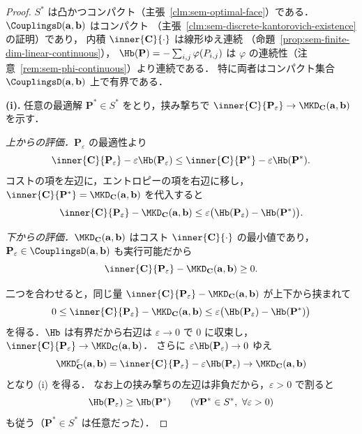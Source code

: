 \begin{proof}
  $S^*$ は凸かつコンパクト（主張~\ref{clm:sem-optimal-face}）である．
  $\CouplingsD(\mathbf{a},\mathbf{b})$ はコンパクト
  （主張~\ref{clm:sem-discrete-kantorovich-existence} の証明）であり，
  内積 $\inner{\mathbf{C}}{\cdot}$ は線形ゆえ連続
  （命題~\ref{prop:sem-finite-dim-linear-continuous}），
  $\Hb(\mathbf{P}) = -\sum_{i,j}\varphi(P_{i,j})$ は
  $\varphi$ の連続性（注意~\ref{rem:sem-phi-continuous}）より連続である．
  特に両者はコンパクト集合 $\CouplingsD(\mathbf{a},\mathbf{b})$ 上で有界である．

  \textbf{(i).}
  任意の最適解 $\mathbf{P}^* \in S^*$ をとり，挟み撃ちで
  $\inner{\mathbf{C}}{\mathbf{P}_\varepsilon} \to \MKD_{\mathbf{C}}(\mathbf{a},\mathbf{b})$ を示す．

  \emph{上からの評価．}$\mathbf{P}_\varepsilon$ の最適性より
  \[
    \inner{\mathbf{C}}{\mathbf{P}_\varepsilon} - \varepsilon\Hb(\mathbf{P}_\varepsilon)
    \leq
    \inner{\mathbf{C}}{\mathbf{P}^*} - \varepsilon\Hb(\mathbf{P}^*).
  \]
  コストの項を左辺に，エントロピーの項を右辺に移し，
  $\inner{\mathbf{C}}{\mathbf{P}^*} = \MKD_{\mathbf{C}}(\mathbf{a},\mathbf{b})$ を代入すると
  \[
    \inner{\mathbf{C}}{\mathbf{P}_\varepsilon} - \MKD_{\mathbf{C}}(\mathbf{a},\mathbf{b})
    \leq
    \varepsilon\bigl(\Hb(\mathbf{P}_\varepsilon) - \Hb(\mathbf{P}^*)\bigr).
  \]

  \emph{下からの評価．}$\MKD_{\mathbf{C}}(\mathbf{a},\mathbf{b})$ はコスト $\inner{\mathbf{C}}{\cdot}$ の最小値であり，
  $\mathbf{P}_\varepsilon \in \CouplingsD(\mathbf{a},\mathbf{b})$ も実行可能だから
  \[
    \inner{\mathbf{C}}{\mathbf{P}_\varepsilon} - \MKD_{\mathbf{C}}(\mathbf{a},\mathbf{b}) \geq 0 .
  \]

  二つを合わせると，同じ量
  $\inner{\mathbf{C}}{\mathbf{P}_\varepsilon} - \MKD_{\mathbf{C}}(\mathbf{a},\mathbf{b})$
  が上下から挟まれて
  \[
    0
    \leq
    \inner{\mathbf{C}}{\mathbf{P}_\varepsilon} - \MKD_{\mathbf{C}}(\mathbf{a},\mathbf{b})
    \leq
    \varepsilon\bigl(\Hb(\mathbf{P}_\varepsilon) - \Hb(\mathbf{P}^*)\bigr)
  \]
  を得る．$\Hb$ は有界だから右辺は $\varepsilon \to 0$ で $0$ に収束し，
  $\inner{\mathbf{C}}{\mathbf{P}_\varepsilon} \to \MKD_{\mathbf{C}}(\mathbf{a},\mathbf{b})$．
  さらに $\varepsilon\Hb(\mathbf{P}_\varepsilon) \to 0$ ゆえ
  \[
    \MKD_{\mathbf{C}}^\varepsilon(\mathbf{a},\mathbf{b})
    = \inner{\mathbf{C}}{\mathbf{P}_\varepsilon} - \varepsilon\Hb(\mathbf{P}_\varepsilon)
    \to \MKD_{\mathbf{C}}(\mathbf{a},\mathbf{b})
  \]
  となり (i) を得る．
  なお上の挟み撃ちの左辺は非負だから，$\varepsilon > 0$ で割ると
  \[
    \Hb(\mathbf{P}_\varepsilon) \geq \Hb(\mathbf{P}^*)
    \qquad (\forall \mathbf{P}^* \in S^*,\ \forall \varepsilon > 0)
  \]
  も従う（$\mathbf{P}^* \in S^*$ は任意だった）．


\end{proof}
